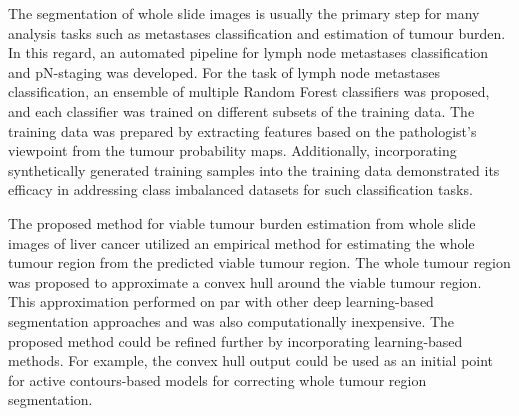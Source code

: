 \documentclass[times,twocolumn,final,authoryear]{tmp}
\begin{document}
The segmentation of whole slide images is usually the primary step for many analysis tasks such as metastases classification and estimation of tumour burden.  In this regard, an automated pipeline for lymph node metastases classification and pN-staging was developed. For the task of lymph node metastases classification, an ensemble of multiple Random Forest classifiers was proposed, and each classifier was trained on different subsets of the training data. The training data was prepared by extracting features based on the pathologist's viewpoint from the tumour probability maps. Additionally, incorporating synthetically generated training samples into the training data demonstrated its efficacy in addressing class imbalanced datasets for such classification tasks. 

The proposed method for viable tumour burden estimation from whole slide images of liver cancer utilized an empirical method for estimating the whole tumour region from the predicted viable tumour region. The whole tumour region was proposed to approximate a convex hull around the viable tumour region. This approximation performed on par with other deep learning-based segmentation approaches and was also computationally inexpensive. The proposed method could be refined further by incorporating learning-based methods. For example, the convex hull output could be used as an initial point for active contours-based models \citep{kass1988snakes} for correcting whole tumour region segmentation. 



 
\end{document}
